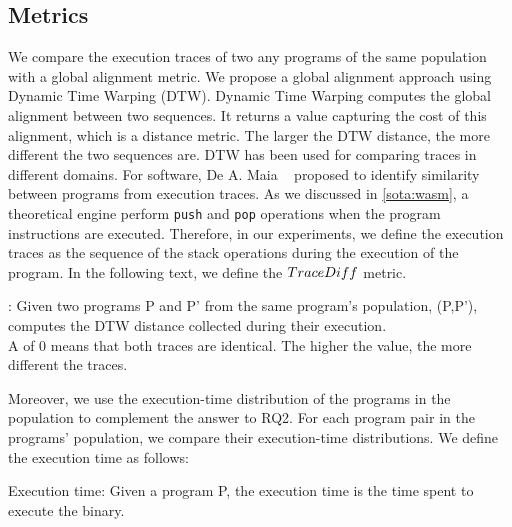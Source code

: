 \subsection*{Metrics}
\label{rq2:metrics}

We compare the execution traces of two any programs of the same population with a global alignment metric. We propose a global alignment approach using Dynamic Time Warping (DTW).
Dynamic Time Warping \cite{NEEDLEMAN1970443} computes the global alignment between two sequences. It returns a value capturing the cost of this alignment, which is a distance metric. The larger the DTW distance, the more different the two sequences are.
DTW has been used for comparing traces in different domains. For software, De A. Maia \etal\ \cite{Maia08usinga} proposed to identify similarity between programs from execution traces.
As we discussed in \autoref{sota:wasm}, a theoretical \wasm engine perform \texttt{push} and \texttt{pop} operations when the program instructions are executed. Therefore, in our experiments, we define the execution traces as the sequence of the stack operations during the execution of the \wasm program. 
In the following text, we define the $TraceDiff$ metric. 
 

\begin{metric}{\DTW{}:}
\label{metric:stack}
\normalfont 
	Given two programs P and P' from the same program's population, \DTW{}(P,P'), computes the DTW distance collected during their execution. \\
	A \DTW{} of $0$ means that both traces are identical.
	The higher the value, the more different the traces. 
\end{metric}



Moreover, we use the execution-time distribution of the programs in the population to complement the answer to RQ2. For each program pair in the programs' population, we compare their execution-time distributions. We define the execution time as follows:

\begin{metric}{Execution time:}\label{metric:time}
    \normalfont 
	Given a \wasm program P, the execution time is the time spent to execute the binary.
\end{metric}



